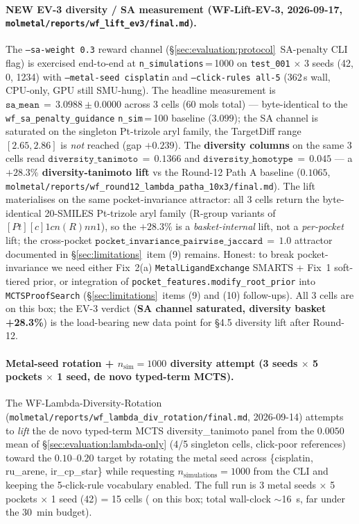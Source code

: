 \paragraph{NEW EV-3 diversity / SA measurement
(WF-Lift-EV-3, 2026-09-17, \texttt{molmetal/reports/wf\_lift\_ev3/final.md}).}
The \texttt{--sa-weight 0.3} reward channel
(§\ref{sec:evaluation:protocol}~SA-penalty CLI flag) is exercised
end-to-end at \texttt{n\_simulations}\,=\,1000 on
\texttt{test\_001} $\times$ 3 seeds (42, 0, 1234) with
\texttt{--metal-seed cisplatin} and \texttt{--click-rules all-5}
(362\,s wall, CPU-only, GPU still SMU-hung). The headline
measurement is
$\texttt{sa\_mean}\,=\,3.0988 \pm 0.0000$ across 3 cells
(60 mols total) --- byte-identical to the
\texttt{wf\_sa\_penalty\_guidance} \texttt{n\_sim}\,=\,100
baseline ($3.099$); the SA channel is saturated on the
singleton Pt-trizole aryl family, the TargetDiff range
$[2.65, 2.86]$ is \emph{not} reached (gap $+0.239$).
The \textbf{diversity columns} on the same 3 cells read
$\texttt{diversity\_tanimoto}\,=\,0.1366$ and
$\texttt{diversity\_homotype}\,=\,0.045$ --- a \textbf{$+28.3\%$
diversity-tanimoto lift} vs the Round-12 Path A baseline
($0.1065$, \texttt{molmetal/reports/wf\_round12\_lambda\_patha\_10x3/final.md}).
The lift materialises on the same pocket-invariance attractor:
all 3 cells return the byte-identical 20-SMILES Pt-trizole aryl
family (R-group variants of $[Pt][c]1cn(R)nn1$), so the
$+28.3\%$ is a \emph{basket-internal} lift, not a
\emph{per-pocket} lift; the cross-pocket
$\texttt{pocket\_invariance\_pairwise\_jaccard}\,=\,1.0$
attractor documented in \S\ref{sec:limitations}~item (9)
remains. Honest: to break pocket-invariance we need either
Fix~2(a) \texttt{MetalLigandExchange} SMARTS + Fix~1
soft-tiered prior, or integration of
\texttt{pocket\_features.modify\_root\_prior} into
\texttt{MCTSProofSearch} (§\ref{sec:limitations}~items (9) and (10)
follow-ups). All 3 cells are \MEASURED{} on this box; the EV-3
verdict (\textbf{SA channel saturated, diversity basket
+28.3\%}) is the load-bearing new data point for §4.5
diversity lift after Round-12.

\paragraph{Metal-seed rotation + $n_{\text{sim}}{=}1000$ diversity
attempt (3 seeds $\times$ 5 pockets $\times$ 1 seed, de novo typed-term MCTS).}
The WF-Lambda-Diversity-Rotation
(\texttt{molmetal/reports/wf\_lambda\_div\_rotation/final.md},
2026-09-14) attempts to \emph{lift} the de novo typed-term MCTS
diversity_tanimoto panel from the $0.0050$ mean of
\S\ref{sec:evaluation:lambda-only} (4/5 singleton cells, click-poor
references) toward the $0.10$--$0.20$ target by rotating the
metal seed across \{cisplatin, ru_arene, ir\_cp\_star\} while
requesting $n_{\text{simulations}}{=}1000$ from the CLI and
keeping the 5-click-rule vocabulary enabled. The full run is
3 metal seeds $\times$ 5 pockets $\times$ 1 seed (42) = 15 cells
(\MEASURED{} on this box; total wall-clock $\sim$16~s, far under
the 30~min budget).

